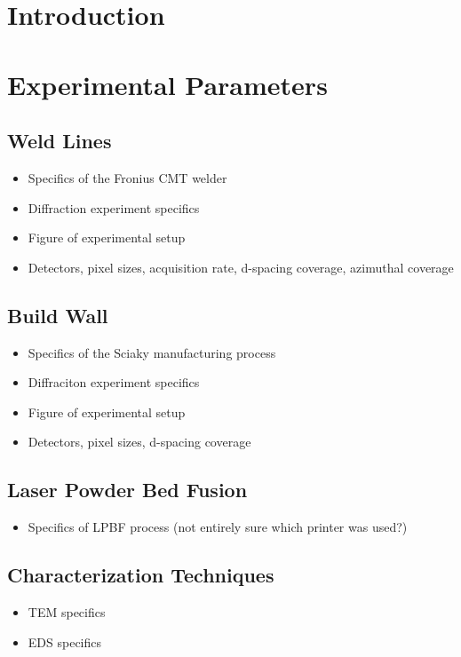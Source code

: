 \documentclass{revtex4-1}
\begin{document}
\section{Introduction}


\section{Experimental Parameters}
\subsection{Weld Lines}
\begin{itemize}
	\item Specifics of the Fronius CMT welder
	\item Diffraction experiment specifics
	\item Figure of experimental setup
	\item Detectors, pixel sizes, acquisition rate, d-spacing coverage, azimuthal coverage
\end{itemize}

\subsection{Build Wall}
\begin{itemize}
	\item Specifics of the Sciaky manufacturing process
	\item Diffraciton experiment specifics
	\item Figure of experimental setup
	\item Detectors, pixel sizes, d-spacing coverage
\end{itemize}

\subsection{Laser Powder Bed Fusion}
\begin{itemize}
	\item Specifics of LPBF process (not entirely sure which printer was used?)
\end{itemize}

\subsection{Characterization Techniques}
\begin{itemize}
	\item TEM specifics
	\item EDS specifics
\end{itemize}
\end{document}
